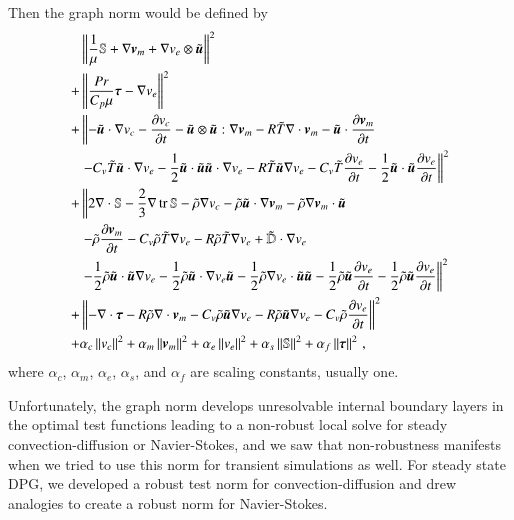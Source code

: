 \documentclass[preprint,12pt]{elsarticle}
\begin{document}
Then the graph norm would be defined by
\begin{equation}
\begin{aligned}
&\left\| \frac{1}{\mu}\mathbb{S}+\nabla\boldsymbol v_m+\nabla v_e\otimes\tilde{\boldsymbol u} \right\|^2\\
+&\left\| \frac{Pr}{C_p\mu}\boldsymbol\tau-\nabla v_e \right\|^2\\
+&\left\|
-\tilde{\boldsymbol u}\cdot\nabla v_c-\frac{\partial v_c}{\partial t}-\tilde{\boldsymbol u}\otimes\tilde{\boldsymbol u}:\nabla\boldsymbol v_m
-R\tilde T\nabla\cdot\boldsymbol v_m-\tilde{\boldsymbol u}\cdot\frac{\partial\boldsymbol v_m}{\partial t}\right.\\
&\left.-C_v\tilde T\tilde{\boldsymbol u}\cdot\nabla v_e-\frac{1}{2}\tilde{\boldsymbol u}\cdot\tilde{\boldsymbol u}\tilde{\boldsymbol u}\cdot\nabla v_e
-R\tilde T\tilde{\boldsymbol u}\nabla v_e
-C_v\tilde T\frac{\partial v_e}{\partial t}-\frac{1}{2}\tilde{\boldsymbol u}\cdot\tilde{\boldsymbol u}\frac{\partial v_e}{\partial t}
\right\|^2\\
+&\left\|2\nabla\cdot\mathbb{S}-\frac{2}{3}\nabla\operatorname*{tr}{\mathbb{S}}
-\tilde\rho\nabla v_c
-\tilde\rho\tilde{\boldsymbol u}\cdot\nabla\boldsymbol v_m-\tilde\rho\nabla\boldsymbol v_m\cdot\tilde{\boldsymbol u}
\right.\\
&\left.
-\tilde\rho\frac{\partial\boldsymbol v_m}{\partial t}
-C_v\tilde\rho\tilde T\nabla v_e
-R\tilde\rho\tilde T\nabla v_e
+\tilde{\mathbb{D}}\cdot\nabla v_e
\right.\\
&\left.
-\frac{1}{2}\tilde\rho\tilde{\boldsymbol u}\cdot\tilde{\boldsymbol u}\nabla v_e
-\frac{1}{2}\tilde\rho\tilde{\boldsymbol u}\cdot\nabla v_e\tilde{\boldsymbol u}
-\frac{1}{2}\tilde\rho\nabla v_e\cdot\tilde{\boldsymbol u}\tilde{\boldsymbol u}
-\frac{1}{2}\tilde\rho\tilde{\boldsymbol u}\frac{\partial v_e}{\partial t}
-\frac{1}{2}\tilde\rho\tilde{\boldsymbol u}\frac{\partial v_e}{\partial t}
\right\|^2\\
+&\left\|-\nabla\cdot\boldsymbol\tau
-R\tilde\rho\nabla\cdot\boldsymbol v_m
-C_v\tilde\rho\tilde{\boldsymbol u}\nabla v_e
-R\tilde\rho\tilde{\boldsymbol u}\nabla v_e
-C_v\tilde\rho\frac{\partial v_e}{\partial t}
\right\|^2\\
+&\alpha_c\left\| v_c \right\|^2
+\alpha_m\left\| \boldsymbol v_m \right\|^2
+\alpha_e\left\| v_e \right\|^2
+\alpha_s\left\| \mathbb{S} \right\|^2
+\alpha_f\left\| \boldsymbol\tau \right\|^2
\,,
\end{aligned}
\end{equation}
where $\alpha_c$, $\alpha_m$, $\alpha_e$, $\alpha_s$, and $\alpha_f$ are scaling constants, usually one.

Unfortunately, the graph norm develops unresolvable internal boundary layers in the optimal test functions leading to a non-robust
local solve for steady convection-diffusion or Navier-Stokes,
and we saw that non-robustness manifests when we tried to use this norm for transient simulations as well.
For steady state DPG, we developed a robust test norm for convection-diffusion and drew analogies to create 
a robust norm for Navier-Stokes.
\end{document}
